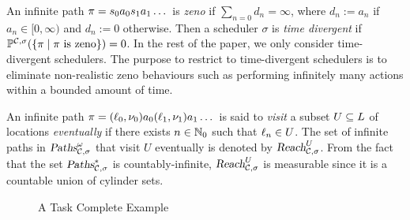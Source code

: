 \smallskip {}
An infinite path $\infpath=s_0a_0s_1a_1\dots$ is \emph{zeno} if $\sum_{n=0} d_n=\infty$, where $d_n:=a_n$ if $a_n\in [0,\infty)$ and $d_n:=0$ otherwise.
Then a scheduler $\sigma$ is \emph{time divergent} if $\probm^{\pta,\sigma}(\{\pi\mid\pi\mbox{ is zeno}\})=0$.
In the rest of the paper, we only consider time-divergent schedulers.
The purpose to restrict to time-divergent schedulers is to eliminate non-realistic zeno behaviours such as performing infinitely many actions within a bounded amount of time.

\smallskip {} An infinite path $\infpath=(\loc_0,\nu_0)a_0(\loc_1,\nu_1)a_1\dots$ is said to \emph{visit} a subset $U\subseteq\locs$ of locations \emph{eventually} if there exists $n\in\Nset_0$ such that $\loc_n\in U$. The set of infinite paths in $\infpaths{\pta,\sigma}$ that visit $U$ eventually is denoted by $\omgpaths{\pta,\sigma}{U}$.
From the fact that the set $\fnpaths{\pta,\sigma}$ is countably-infinite, $\omgpaths{\pta,\sigma}{U}$ is measurable since it is a countable union of cylinder sets.

\begin{figure}
    \centering
    \resizebox{.5\textwidth}{!}{
        
        }
    \caption{A Task Complete Example}
    \label{fig:pta}  
\end{figure}

